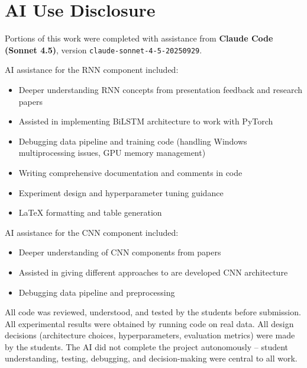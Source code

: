 \documentclass[letterpaper]{article} %
\begin{document}
\section*{AI Use Disclosure}

Portions of this work were completed with assistance from \textbf{Claude Code (Sonnet 4.5)}, version \texttt{claude-sonnet-4-5-20250929}.

AI assistance for the RNN component included:
\begin{itemize}
\item Deeper understanding RNN concepts from presentation feedback and research papers
\item Assisted in implementing BiLSTM architecture to work with PyTorch
\item Debugging data pipeline and training code (handling Windows multiprocessing issues, GPU memory management)
\item Writing comprehensive documentation and comments in code
\item Experiment design and hyperparameter tuning guidance
\item LaTeX formatting and table generation
\end{itemize}

AI assistance for the CNN component included:
\begin{itemize}
\item Deeper understanding of CNN components from papers
\item Assisted in giving different approaches to are developed CNN architecture
\item Debugging data pipeline and preprocessing
\end{itemize}

All code was reviewed, understood, and tested by the students before submission. All experimental results were obtained by running code on real data. All design decisions (architecture choices, hyperparameters, evaluation metrics) were made by the students. The AI did not complete the project autonomously -- student understanding, testing, debugging, and decision-making were central to all work.



\end{document}

